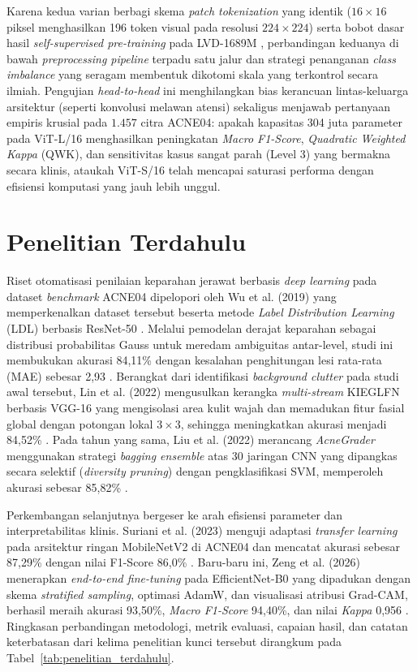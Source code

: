 Karena kedua varian berbagi skema \textit{patch tokenization} yang identik ($16 \times 16$ piksel menghasilkan 196 token visual pada resolusi $224 \times 224$) serta bobot dasar hasil \textit{self-supervised pre-training} pada LVD-1689M \cite{simeoni2025dinov3}, perbandingan keduanya di bawah \textit{preprocessing pipeline} terpadu satu jalur dan strategi penanganan \textit{class imbalance} yang seragam membentuk dikotomi skala yang terkontrol secara ilmiah. Pengujian \textit{head-to-head} ini menghilangkan bias kerancuan lintas-keluarga arsitektur (seperti konvolusi melawan atensi) sekaligus menjawab pertanyaan empiris krusial pada $1.457$ citra ACNE04: apakah kapasitas 304 juta parameter pada ViT-L/16 menghasilkan peningkatan \textit{Macro F1-Score}, \textit{Quadratic Weighted Kappa} (QWK), dan sensitivitas kasus sangat parah (Level 3) yang bermakna secara klinis, ataukah ViT-S/16 telah mencapai saturasi performa dengan efisiensi komputasi yang jauh lebih unggul.


\section{Penelitian Terdahulu}

Riset otomatisasi penilaian keparahan jerawat berbasis \textit{deep learning} pada dataset \textit{benchmark} ACNE04 dipelopori oleh Wu et al. (2019) yang memperkenalkan dataset tersebut beserta metode \textit{Label Distribution Learning} (LDL) berbasis ResNet-50 \cite{wu2019}. Melalui pemodelan derajat keparahan sebagai distribusi probabilitas Gauss untuk meredam ambiguitas antar-level, studi ini membukukan akurasi 84,11\% dengan kesalahan penghitungan lesi rata-rata (MAE) sebesar 2,93 \cite{wu2019}. Berangkat dari identifikasi \textit{background clutter} pada studi awal tersebut, Lin et al. (2022) mengusulkan kerangka \textit{multi-stream} KIEGLFN berbasis VGG-16 yang mengisolasi area kulit wajah dan memadukan fitur fasial global dengan potongan lokal $3\times 3$, sehingga meningkatkan akurasi menjadi 84,52\% \cite{lin2022}. Pada tahun yang sama, Liu et al. (2022) merancang \textit{AcneGrader} menggunakan strategi \textit{bagging ensemble} atas 30 jaringan CNN yang dipangkas secara selektif (\textit{diversity pruning}) dengan pengklasifikasi SVM, memperoleh akurasi sebesar 85,82\% \cite{liu2022}.

Perkembangan selanjutnya bergeser ke arah efisiensi parameter dan interpretabilitas klinis. Suriani et al. (2023) menguji adaptasi \textit{transfer learning} pada arsitektur ringan MobileNetV2 di ACNE04 dan mencatat akurasi sebesar 87,29\% dengan nilai F1-Score 86,0\% \cite{suriani2023}. Baru-baru ini, Zeng et al. (2026) menerapkan \textit{end-to-end fine-tuning} pada EfficientNet-B0 yang dipadukan dengan skema \textit{stratified sampling}, optimasi AdamW, dan visualisasi atribusi Grad-CAM, berhasil meraih akurasi 93,50\%, \textit{Macro F1-Score} 94,40\%, dan nilai \textit{Kappa} 0,956 \cite{zeng2026}. Ringkasan perbandingan metodologi, metrik evaluasi, capaian hasil, dan catatan keterbatasan dari kelima penelitian kunci tersebut dirangkum pada Tabel~\ref{tab:penelitian_terdahulu}.

